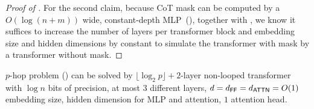 \begin{proof}[Proof of ]
For the second claim, because CoT mask can be computed by a $O(\log(n+m))$ wide, constant-depth MLP~(), together with , we know it suffices to increase the number of layers per transformer block and embedding size and hidden dimensions by constant to simulate the transformer with mask by a transformer without mask. 
\end{proof}





\begin{theorem}\label{thm:khop_log_depth}
    $p$-hop problem () can be solved by $\lfloor\log_2 p\rfloor+2$-layer non-looped transformer with $\log n$ bits of precision, at most $3$ different layers, $d=d_{\mathsf{FF}}=d_{\mathsf{ATTN}}=O(1)$ embedding size, hidden dimension for MLP and attention, $1$ attention head.
\end{theorem}


